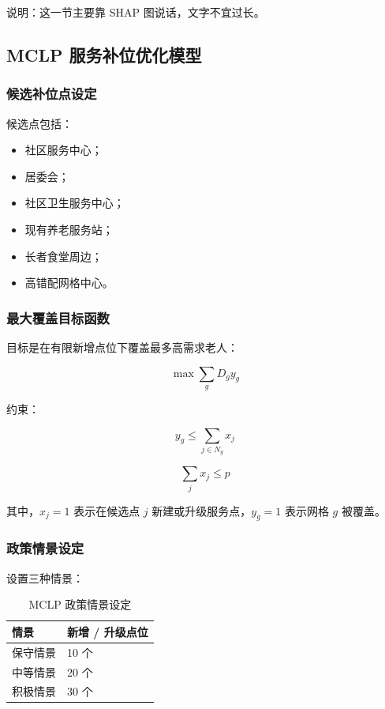 说明：这一节主要靠 SHAP 图说话，文字不宜过长。

\subsection{MCLP 服务补位优化模型}

\subsubsection{候选补位点设定}

候选点包括：

\begin{itemize}
\item 社区服务中心；
\item 居委会；
\item 社区卫生服务中心；
\item 现有养老服务站；
\item 长者食堂周边；
\item 高错配网格中心。
\end{itemize}

\subsubsection{最大覆盖目标函数}

目标是在有限新增点位下覆盖最多高需求老人：

\begin{equation}
\max \sum_g D_g y_g
\end{equation}

约束：

\begin{equation}
y_g \leq \sum_{j \in N_g}x_j
\end{equation}

\begin{equation}
\sum_j x_j \leq p
\end{equation}

其中，$x_j=1$ 表示在候选点 $j$ 新建或升级服务点，$y_g=1$ 表示网格 $g$ 被覆盖。

\subsubsection{政策情景设定}

设置三种情景：

\begin{table}[H]
\centering
\caption{MCLP 政策情景设定}
\begin{tabular}{ll}
\toprule
\rowcolor{tablehead}
情景 & 新增 / 升级点位 \\
\midrule
保守情景 & 10 个 \\
中等情景 & 20 个 \\
积极情景 & 30 个 \\
\bottomrule
\end{tabular}
\end{table}

